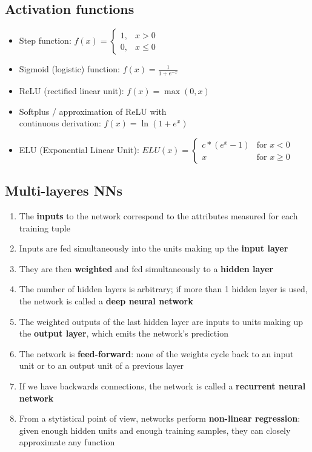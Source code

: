 \documentclass{article}
\begin{document}
    \subsection{Activation functions}
    \begin{itemize}
        \item Step function: $f(x) = \begin{cases}
            1, & x > 0 \\
            0, & x \leq 0
        \end{cases}$
        \item Sigmoid (logistic) function: $f(x) = \frac{1}{1 + e^{-x}}$
        \item ReLU (rectified linear unit): $f(x) = \max(0, x)$
        \item Softplus / approximation of ReLU with \\ continuous derivation: $f(x) = \ln(1 + e^x)$
        \item ELU (Exponential Linear Unit): $ELU(x) = \begin{cases}
            c * (e^x - 1) & \text{for } x < 0 \\
            x & \text{for } x \geq 0
        \end{cases}$
    \end{itemize}

    \subsection{Multi-layeres NNs}
    \begin{enumerate}
        \item The \textbf{inputs} to the network correspond to the attributes measured for each training tuple
        \item Inputs are fed simultaneously into the units making up the \textbf{input layer}
        \item They are then \textbf{weighted} and fed simultaneously to a \textbf{hidden layer}
        \item The number of hidden layers is arbitrary; if more than 1 hidden layer is used, the network is called a \textbf{deep neural network}
        \item The weighted outputs of the last hidden layer are inputs to units making up the \textbf{output layer},  which emits the network's prediction
        \item The network is \textbf{feed-forward}: none of the weights cycle back to an input unit or to an output unit of a previous layer
        \item If we have backwards connections, the network is called a \textbf{recurrent neural network}
        \item From a stytistical point of view, networks perform \textbf{non-linear regression}: given enough hidden units and enough training samples, they can closely approximate any function
    \end{enumerate}
\end{document}
